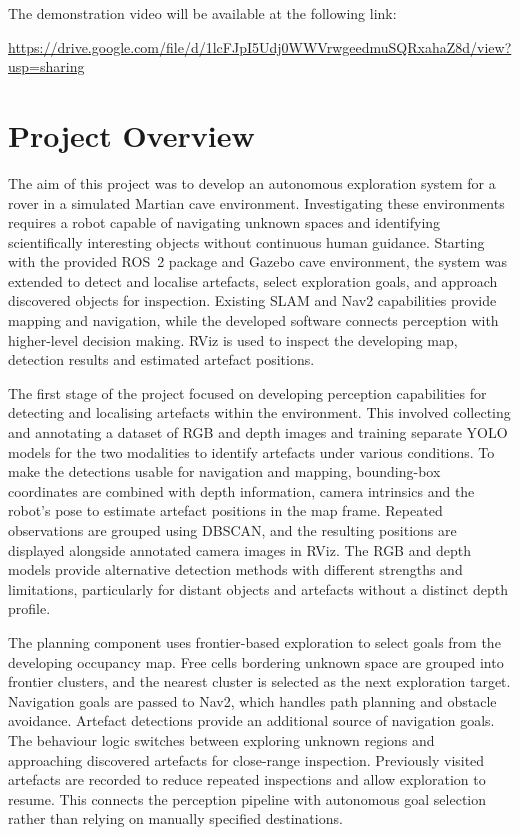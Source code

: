 \documentclass[a4paper,11pt]{article}
\begin{document}
The demonstration video will be available at the following link:

\begin{center}
    \url{https://drive.google.com/file/d/1lcFJpI5Udj0WWVrwgeedmuSQRxahaZ8d/view?usp=sharing}
\end{center}

\tableofcontents
\clearpage

\section{Project Overview}

The aim of this project was to develop an autonomous exploration system for a
rover in a simulated Martian cave environment. Investigating these environments
requires a robot capable of navigating unknown spaces and identifying
scientifically interesting objects without continuous human guidance. Starting
with the provided ROS~2 package and Gazebo cave environment, the system was
extended to detect and localise artefacts, select exploration goals, and approach
discovered objects for inspection. Existing SLAM and Nav2 capabilities provide
mapping and navigation, while the developed software connects perception with
higher-level decision making. RViz is used to inspect the developing map,
detection results and estimated artefact positions.

The first stage of the project focused on developing perception capabilities
for detecting and localising artefacts within the environment. This involved
collecting and annotating a dataset of RGB and depth images and training
separate YOLO models for the two modalities to identify artefacts under various
conditions. To make the detections usable for navigation and mapping,
bounding-box coordinates are combined with depth information, camera intrinsics
and the robot's pose to estimate artefact positions in the map frame. Repeated
observations are grouped using DBSCAN, and the resulting positions are displayed
alongside annotated camera images in RViz. The RGB and depth models provide
alternative detection methods with different strengths and limitations,
particularly for distant objects and artefacts without a distinct depth profile.

The planning component uses frontier-based exploration to select goals from
the developing occupancy map. Free cells bordering unknown space are grouped
into frontier clusters, and the nearest cluster is selected as the next
exploration target. Navigation goals are passed to Nav2, which handles path
planning and obstacle avoidance. Artefact detections provide an additional
source of navigation goals. The behaviour logic switches between exploring
unknown regions and approaching discovered artefacts for close-range inspection.
Previously visited artefacts are recorded to reduce repeated inspections and
allow exploration to resume. This connects the perception pipeline with
autonomous goal selection rather than relying on manually specified destinations.
\end{document}
